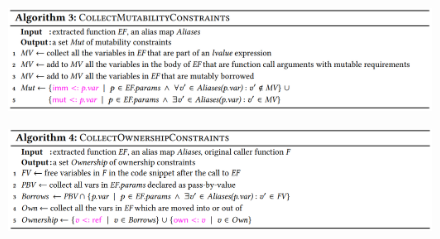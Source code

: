 \begin{figure}[h!]
    \centering
    \includegraphics[width=\textwidth]{figures/algo_3.png}
    \label{fig:algo_3}
\end{figure}

\begin{figure}[h!]
    \centering
    \includegraphics[width=\textwidth]{figures/algo_4.png}
    \label{fig:algo_4}
\end{figure}